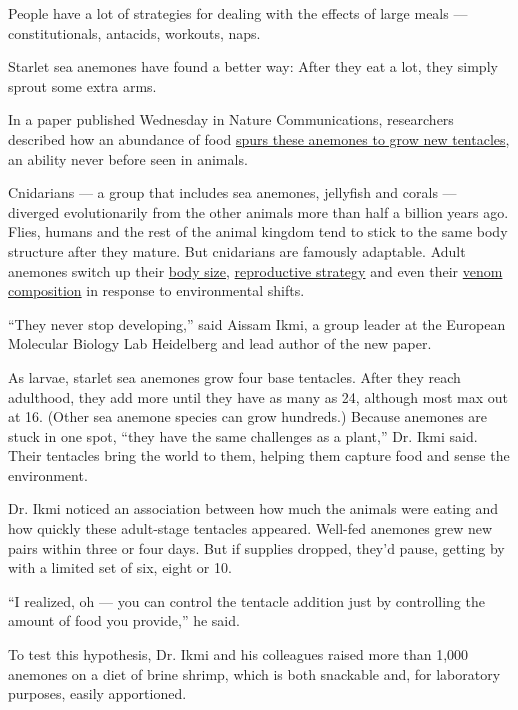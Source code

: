 People have a lot of strategies for dealing with the effects of large
meals --- constitutionals, antacids, workouts, naps.

Starlet sea anemones have found a better way: After they eat a lot, they
simply sprout some extra arms.

In a paper published Wednesday in Nature Communications, researchers
described how an abundance of food
\href{https://www.nature.com/articles/s41467-020-18133-0}{spurs these
anemones to grow new tentacles}, an ability never before seen in
animals.

Cnidarians --- a group that includes sea anemones, jellyfish and corals
--- diverged evolutionarily from the other animals more than half a
billion years ago. Flies, humans and the rest of the animal kingdom tend
to stick to the same body structure after they mature. But cnidarians
are famously adaptable. Adult anemones switch up their
\href{https://pubmed.ncbi.nlm.nih.gov/29351015/}{body size},
\href{https://journals.plos.org/plosone/article?id=10.1371/journal.pone.0011874}{reproductive
strategy} and even their
\href{https://www.atlasobscura.com/articles/sea-anemone-venom-change}{venom
composition} in response to environmental shifts.

``They never stop developing,'' said Aissam Ikmi, a group leader at the
European Molecular Biology Lab Heidelberg and lead author of the new
paper.

As larvae, starlet sea anemones grow four base tentacles. After they
reach adulthood, they add more until they have as many as 24, although
most max out at 16. (Other sea anemone species can grow hundreds.)
Because anemones are stuck in one spot, ``they have the same challenges
as a plant,'' Dr. Ikmi said. Their tentacles bring the world to them,
helping them capture food and sense the environment.

Dr. Ikmi noticed an association between how much the animals were eating
and how quickly these adult-stage tentacles appeared. Well-fed anemones
grew new pairs within three or four days. But if supplies dropped,
they'd pause, getting by with a limited set of six, eight or 10.

``I realized, oh --- you can control the tentacle addition just by
controlling the amount of food you provide,'' he said.

To test this hypothesis, Dr. Ikmi and his colleagues raised more than
1,000 anemones on a diet of brine shrimp, which is both snackable and,
for laboratory purposes, easily apportioned.

